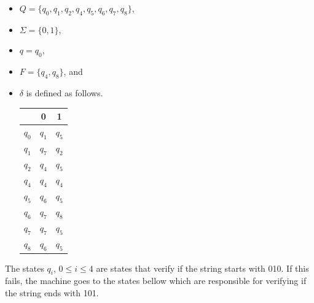 \documentclass[11pt]{article}
\begin{document}
\begin{itemize}
	\item $Q = \{q_0, q_1, q_2, q_4, q_5, q_6, q_7, q_8\}$,	
	\item $\Sigma = \{0,1\}$,
	\item $q = q_0$,
	\item $F = \{q_4, q_8\}$, and
        \item $\delta$ is defined as follows.

\begin{tabular}{|c||c|c|}  \hline
      & 0 & 1 \\ \hline 
      $q_0$ & $q_1$ & $q_5$ \\ \hline 
      $q_1$ & $q_7$ & $q_2$ \\ \hline
      $q_2$ & $q_4$ & $q_5$ \\ \hline
      $q_4$ & $q_4$ & $q_4$ \\ \hline 
      $q_5$ & $q_6$ & $q_5$ \\ \hline 
      $q_6$ & $q_7$ & $q_8$ \\ \hline 
      $q_7$ & $q_7$ & $q_5$ \\ \hline 
      $q_8$ & $q_6$ & $q_5$ \\ \hline 
\end{tabular}
\end{itemize}

\begin{figure}[h]
\centering
{}
\end{figure}
The states $q_i$, $0 \leq i \leq 4$ are states that verify if the string starts with 010. If this fails, the machine goes to the states bellow which are responsible for verifying if the string ends with 101.
\end{document}
